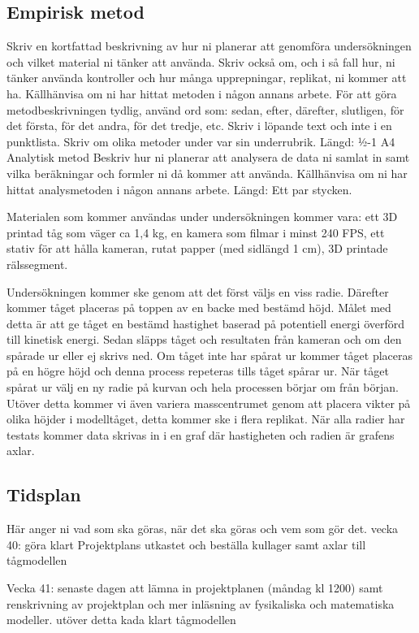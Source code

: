 \subsection{Empirisk metod}
Skriv en kortfattad beskrivning av hur ni planerar att genomföra undersökningen och vilket material ni tänker att använda. Skriv också om, och i så fall hur, ni tänker använda kontroller och hur många upprepningar, replikat, ni kommer att ha. Källhänvisa om ni har hittat metoden i någon annans arbete. För att göra metodbeskrivningen tydlig, använd ord som: sedan, efter, därefter, slutligen, för det första, för det andra, för det tredje, etc. Skriv i löpande text och inte i en punktlista. Skriv om olika metoder under var sin underrubrik.
Längd: ½-1 A4
Analytisk metod
Beskriv hur ni planerar att analysera de data ni samlat in samt vilka beräkningar och formler ni då kommer att använda. Källhänvisa om ni har hittat analysmetoden i någon annans arbete.
Längd: Ett par stycken.

Materialen som kommer användas under undersökningen kommer vara: ett 3D printad tåg som väger ca 1,4 kg, en kamera som filmar i minst 240 FPS, ett stativ för att hålla kameran, rutat papper (med sidlängd 1 cm), 3D printade rälssegment.

Undersökningen kommer ske genom att det först väljs en viss radie. Därefter kommer tåget placeras på toppen av en backe med bestämd höjd. Målet med detta är att ge tåget en bestämd hastighet baserad på potentiell energi överförd till kinetisk energi. Sedan släpps tåget och resultaten från kameran och om den spårade ur eller ej skrivs ned. Om tåget inte har spårat ur kommer tåget placeras på en högre höjd och denna process repeteras tills tåget spårar ur. När tåget spårat ur välj en ny radie på kurvan och hela processen börjar om från början. Utöver detta kommer vi även variera masscentrumet genom att placera vikter på olika höjder i modelltåget, detta kommer ske i flera replikat. När alla radier har testats kommer data skrivas in i en graf där hastigheten och radien är grafens axlar.



\subsection{Tidsplan}
Här anger ni vad som ska göras, när det ska göras och vem som gör det.
vecka 40:
göra klart Projektplans utkastet och beställa kullager samt axlar till tågmodellen

Vecka 41: senaste dagen att lämna in projektplanen (måndag kl 1200) samt renskrivning av projektplan och mer inläsning av fysikaliska och matematiska modeller. utöver detta kada klart tågmodellen

